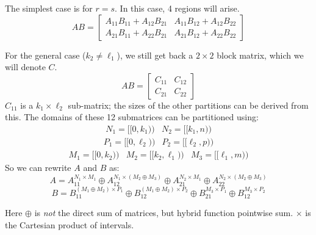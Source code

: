 The simplest case is for $r=s$.
In  this case, 4 regions will arise.
\begin{equation}
	AB = \left[ \begin{array}{cc} 
		A_{11}B_{11}+A_{12}B_{21} & A_{11}B_{12}+A_{12}B_{22} \\ 
		A_{21}B_{11}+A_{22}B_{21} & A_{21}B_{12}+A_{22}B_{22}
	\end{array} \right]
\end{equation}


For the general case ($k_2 \neq \ell_1$), we still get back a $2 \times 2$ block matrix, which we will denote $C$.
\begin{equation}
	AB = \left[ \begin{array}{cc} C_{11} & C_{12} \\ C_{21} & C_{22} \end{array} \right]
\end{equation}
$C_{11}$ is a $k_1 \times \ell_2$ sub-matrix; the sizes of the other partitions can be derived from this.
The domains of these 12 submatrices can be partitioned using:
\begin{equation*}\begin{array}{cc}
	N_1 = [\![0,k_1)\!) & N_2 = [\![k_1, n)\!) 
\end{array}\end{equation*}
\begin{equation*}\begin{array}{cc}
	P_1 = [\![0, \ell_2)\!) & P_2 = [\![ \ell_2, p)\!)
\end{array}\end{equation*}
\begin{equation*}\begin{array}{ccc}
	M_1 = [\![0,k_2)\!) & M_2 = [\![ k_2, \ell_1)\!) & M_3 = [\![ \ell_1, m)\!)
\end{array}\end{equation*}
So we can rewrite $A$ and $B$ as:
\begin{equation}
	A = 	A_{11}^{N_1 \times M_1} \oplus A_{12}^{N_1 \times (M_2 \oplus M_3)} \oplus 
			A_{21}^{N_2 \times M_1} \oplus A_{22}^{N_2 \times (M_2 \oplus M_3)}
\end{equation}
\begin{equation}
	B = 		B_{11}^{(M_1 \oplus M_2) \times P_1} \oplus B_{12}^{(M_1 \oplus M_2) \times P_2} \oplus 
			B_{21}^{M_3 \times P_1} \oplus B_{12}^{M_3 \times P_2}
\end{equation}

Here $\oplus$ is \emph{not} the direct sum of matrices, but hybrid function pointwise sum. 
$\times$ is the Cartesian product of intervals. 

